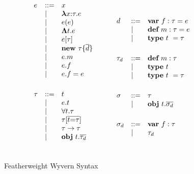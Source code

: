 \begin{figure}
\centering
\[
\begin{array}{lll}

e    & \bnfdef & x \\
     & \bnfalt & \boldsymbol\lambda x{:}\tau . e \\
     & \bnfalt & e(e) \\
     & \bnfalt & \boldsymbol\Lambda t . e \\
     & \bnfalt & e[\tau] \\
     & \bnfalt & \keyw{new}~ \tau \{ \overline{d} \} \\	%
     & \bnfalt & e.m \\
     & \bnfalt & e.f \\
     & \bnfalt & e.f = e \\
\\[1ex]

\tau & \bnfdef & t\\
     & \bnfalt & e.t\\				%
     & \bnfalt & \forall t . \tau\\
     & \bnfalt & \tau[\overline{t{=}\tau}]\\
     & \bnfalt & \tau \rightarrow \tau \\
     & \bnfalt & \keyw{obj}~ t . \overline{\tau_d}\\ %
\\[1ex]

\end{array}
\begin{array}{lll}
~~~~
\end{array}
\begin{array}{lll}
	 
d    & \bnfdef & \keyw{var}~ f:\tau = e \\
     & \bnfalt & \keyw{def}~ m:\tau = e \\
     & \bnfalt & \keyw{type}~ t~ = \tau  \\
\\[1ex]

\tau_d & \bnfdef & \keyw{def}~ m:\tau \\
       & \bnfalt & \keyw{type}~ t  \\
       & \bnfalt & \keyw{type}~ t~ = \tau  \\
\\[1ex]

\sigma & \bnfdef & \tau \\
       & \bnfalt & \keyw{obj}~ t . \overline{\sigma_d} \\
\\[1ex]

\sigma_d & \bnfdef & \keyw{var}~ f:\tau \\
         & \bnfalt & \tau_d \\

\end{array}
\]
\caption{Featherweight Wyvern Syntax}
\label{fig:core2-syntax}
\end{figure}


